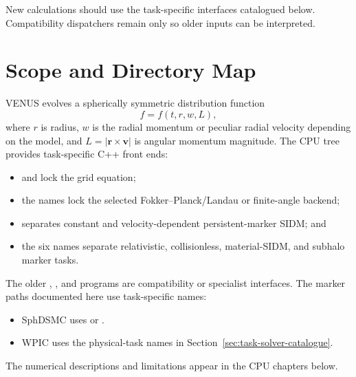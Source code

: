 New calculations should use the task-specific interfaces catalogued below.
Compatibility dispatchers remain only so older inputs can be interpreted.

\section{Scope and Directory Map}

VENUS evolves a spherically symmetric distribution function
\[
  f=f(t,r,w,L),
\]
where \(r\) is radius, \(w\) is the radial momentum or peculiar radial velocity
depending on the model, and \(L=|\bm r\times\bm v|\) is angular momentum
magnitude.
\ifvenusfullcpu
The CPU tree provides task-specific C++ front ends:
\begin{itemize}
\item {} and
 lock the grid equation;
\item the  names lock the selected
Fokker--Planck/Landau or finite-angle backend;
\item {} separates constant and
velocity-dependent persistent-marker SIDM; and
\item the six  names separate relativistic,
collisionless, material-SIDM, and subhalo marker tasks.
\end{itemize}
The older , , and
 programs are compatibility or specialist interfaces.
\else
The marker paths documented here use task-specific names:
\begin{itemize}
\item SphDSMC uses  or
.
\item WPIC uses the physical-task names in
Section~\ref{sec:task-solver-catalogue}.
\end{itemize}
The numerical descriptions and limitations appear in the CPU chapters below.
\fi


